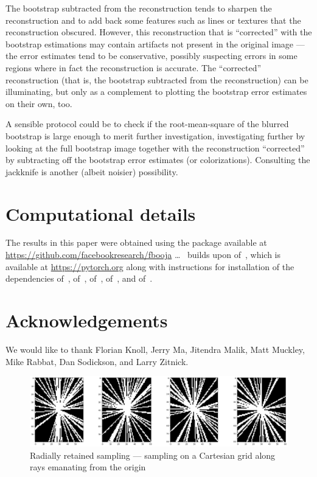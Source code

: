 \documentclass[article]{jdssv}
\begin{document}
The bootstrap subtracted from the reconstruction tends to sharpen
the reconstruction and to add back some features such as lines or textures
that the reconstruction obscured. However, this reconstruction that is
``corrected'' with the bootstrap estimations may contain artifacts
not present in the original image --- the error estimates
tend to be conservative, possibly suspecting errors in some regions
where in fact the reconstruction is accurate. The ``corrected'' reconstruction
(that is, the bootstrap subtracted from the reconstruction)
can be illuminating, but only as a complement
to plotting the bootstrap error estimates on their own, too.

A sensible protocol could be to check if the root-mean-square
of the blurred bootstrap is large enough to merit further investigation,
investigating further by looking at the full bootstrap image
together with the reconstruction ``corrected''
by subtracting off the bootstrap error estimates (or colorizations).
Consulting the jackknife is another (albeit noisier) possibility.




\section*{Computational details}

The results in this paper were obtained using the  package
 available at \url{https://github.com/facebookresearch/fbooja}
\dots\  builds upon  of~\citet{pytorch},
which is available at \url{https://pytorch.org} along with instructions
for installation of the dependencies  of~\citet{matplotlib},
 of~\citet{numpy},  of~\cite{pillow},
 of~\citet{scikit-image}, and  of~\citet{scipy}.




\section*{Acknowledgements}

We would like to thank Florian Knoll, Jerry Ma, Jitendra Malik, Matt Muckley,
Mike Rabbat, Dan Sodickson, and Larry Zitnick.




\begin{figure}
\parbox{\textwidth}{\includegraphics[width=\textwidth]{mask}}
\caption{Radially retained sampling ---
         sampling on a Cartesian grid along rays emanating from the origin}
\label{radialines}
\end{figure}
\end{document}
